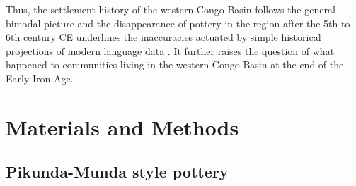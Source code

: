 \documentclass[smallextended,natbib]{svjour3}       %
\begin{document}
Thus, the settlement history of the western Congo Basin follows the general bimodal picture \citep{Seidensticker.2016b,Seidensticker.2021e,Seidensticker.2024} and the disappearance of pottery in the region after the 5th to 6th century CE underlines the inaccuracies actuated by simple historical projections of modern language data \citep{Grollemund.2015,Bostoen.2015,Koile.2022}. It further raises the question of what happened to communities living in the western Congo Basin at the end of the Early Iron Age.

\section{Materials and Methods}\label{materials}

\subsection{Pikunda-Munda style pottery}
\end{document}
